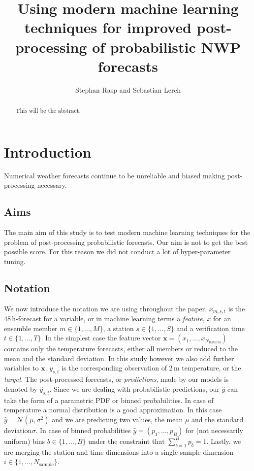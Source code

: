 \documentclass[a4paper,10pt]{scrartcl}
\title{Using modern machine learning techniques for improved post-processing of probabilistic NWP forecasts}
\author{Stephan Rasp and Sebastian Lerch}
\begin{document}
\maketitle

\begin{abstract}
This will be the abstract.
\end{abstract}

\section{Introduction}
Numerical weather forecasts continue to be unreliable and biased \citep{Hemri2014} making post-processing necessary. 

\subsection{Aims}
The main aim of this study is to test modern machine learning techniques for the problem of post-processing probabilistic forecasts. Our aim is not to get the best possible score. For this reason we did not conduct a lot of hyper-parameter tuning. 


\subsection{Notation}
We now introduce the notation we are using throughout the paper. $x_{m, s, t}$ is the 48\,h-forecast for a variable, or in machine learning terms a \textit{feature}, $x$ for an ensemble member $m \in \{1, \dots, M \}$, a station $s \in \{ 1, \dots, S\}$ and a verification time $t \in \{ 1, \dots, T\}$. In the simplest case the feature vector $\mathbf{x} = \left( x_1, \dots, x_{N_{\mathrm{features}}} \right)$ contains only the temperature forecasts, either all members or reduced to the mean and the standard deviation. In this study however we also add further variables to $\mathbf{x}$. $y_{s, t}$ is the corresponding observation of 2\,m temperature, or the \textit{target}. The post-processed forecasts, or \textit{predictions}, made by our models is denoted by $\hat{y}_{s, t}$. Since we are dealing with probabilistic predictions, our $\hat{y}$ can take the form of a parametric PDF or binned probabilities. In case of temperature a normal distribution is a good approximation. In this case $\hat{y} = \mathcal{N}(\mu, \sigma^2)$ and we are predicting two values, the mean $\mu$ and the standard deviation$\sigma$. In case of binned probabilities $\hat{y} = ( p_1, \dots, p_B )$ for (not necessarily uniform) bins $b \in \{1, \dots, B\}$ under the constraint that $\sum_{b=1}^B p_b = 1$. Lastly, we are merging the station and time dimensions into a single sample dimension $i \in \{ 1, \dots, N_{\mathrm{sample}} \}$.
\end{document}

